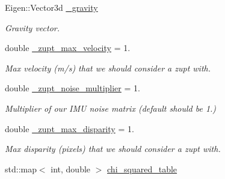 \begin{DoxyCompactItemize}
\mbox{\label{classov__msckf_1_1UpdaterZeroVelocity_aa0bd3b68624d85a6e9db27a1d1631486}} 
Eigen\+::\+Vector3d \hyperlink{classov__msckf_1_1UpdaterZeroVelocity_aa0bd3b68624d85a6e9db27a1d1631486}{\+\_\+gravity}
\begin{DoxyCompactList}\small\item\em Gravity vector. \end{DoxyCompactList}\item 
\mbox{\label{classov__msckf_1_1UpdaterZeroVelocity_a27800e861318dfd8938005dc8b7507cf}} 
double \hyperlink{classov__msckf_1_1UpdaterZeroVelocity_a27800e861318dfd8938005dc8b7507cf}{\+\_\+zupt\+\_\+max\+\_\+velocity} = 1.
\begin{DoxyCompactList}\small\item\em Max velocity (m/s) that we should consider a zupt with. \end{DoxyCompactList}\item 
\mbox{\label{classov__msckf_1_1UpdaterZeroVelocity_a4cb7aba647c32c927075fbffd7573b5e}} 
double \hyperlink{classov__msckf_1_1UpdaterZeroVelocity_a4cb7aba647c32c927075fbffd7573b5e}{\+\_\+zupt\+\_\+noise\+\_\+multiplier} = 1.
\begin{DoxyCompactList}\small\item\em Multiplier of our I\+MU noise matrix (default should be 1.) \end{DoxyCompactList}\item 
\mbox{\label{classov__msckf_1_1UpdaterZeroVelocity_a2ef8c37273e0159bd83cc34cccce1099}} 
double \hyperlink{classov__msckf_1_1UpdaterZeroVelocity_a2ef8c37273e0159bd83cc34cccce1099}{\+\_\+zupt\+\_\+max\+\_\+disparity} = 1.
\begin{DoxyCompactList}\small\item\em Max disparity (pixels) that we should consider a zupt with. \end{DoxyCompactList}\item 
\mbox{\label{classov__msckf_1_1UpdaterZeroVelocity_a5b6c97d5985ae971821aaeaed715e717}} 
std\+::map$<$ int, double $>$ \hyperlink{classov__msckf_1_1UpdaterZeroVelocity_a5b6c97d5985ae971821aaeaed715e717}{chi\+\_\+squared\+\_\+table}

\end{DoxyCompactItemize}
